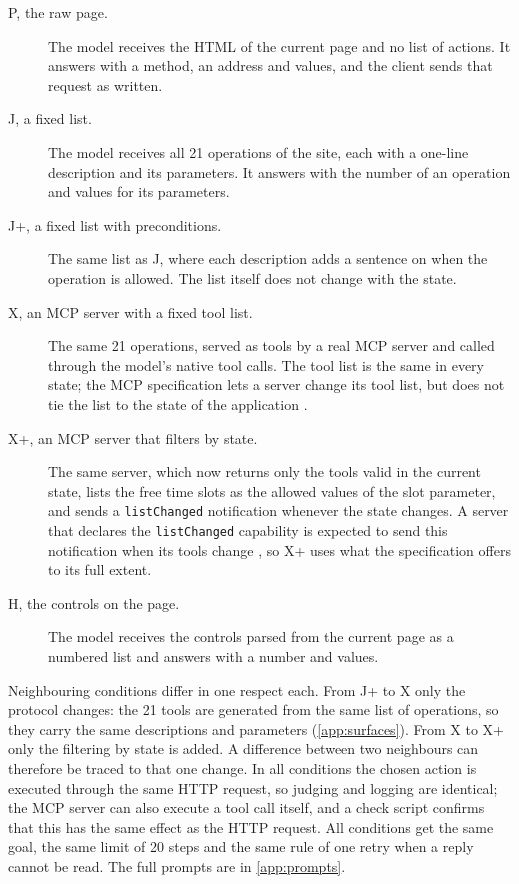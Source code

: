 \begin{description}
    \item[P, the raw page.]
    The model receives the HTML of the current page and no list of actions.
    It answers with a method, an address and values, and the client sends that request as written.
    \item[J, a fixed list.]
    The model receives all 21 operations of the site, each with a one-line description and its parameters.
    It answers with the number of an operation and values for its parameters.
    \item[J+, a fixed list with preconditions.]
    The same list as J, where each description adds a sentence on when the operation is allowed.
    The list itself does not change with the state.
    \item[X, an MCP server with a fixed tool list.]
    The same 21 operations, served as tools by a real MCP server and called through the model's native tool calls.
    The tool list is the same in every state; the MCP specification lets a server change its tool list, but does not tie the list to the state of the application \cite{mcpSpec2025}.
    \item[X+, an MCP server that filters by state.]
    The same server, which now returns only the tools valid in the current state, lists the free time slots as the allowed values of the slot parameter, and sends a \texttt{listChanged} notification whenever the state changes.
    A server that declares the \texttt{listChanged} capability is expected to send this notification when its tools change \cite{mcpSpec2025}, so X+ uses what the specification offers to its full extent.
    \item[H, the controls on the page.]
    The model receives the controls parsed from the current page as a numbered list and answers with a number and values.
\end{description}

Neighbouring conditions differ in one respect each.
From J+ to X only the protocol changes: the 21 tools are generated from the same list of operations, so they carry the same descriptions and parameters (\autoref{app:surfaces}).
From X to X+ only the filtering by state is added.
A difference between two neighbours can therefore be traced to that one change.
In all conditions the chosen action is executed through the same HTTP request, so judging and logging are identical; the MCP server can also execute a tool call itself, and a check script confirms that this has the same effect as the HTTP request.
All conditions get the same goal, the same limit of 20 steps and the same rule of one retry when a reply cannot be read.
The full prompts are in \autoref{app:prompts}.

